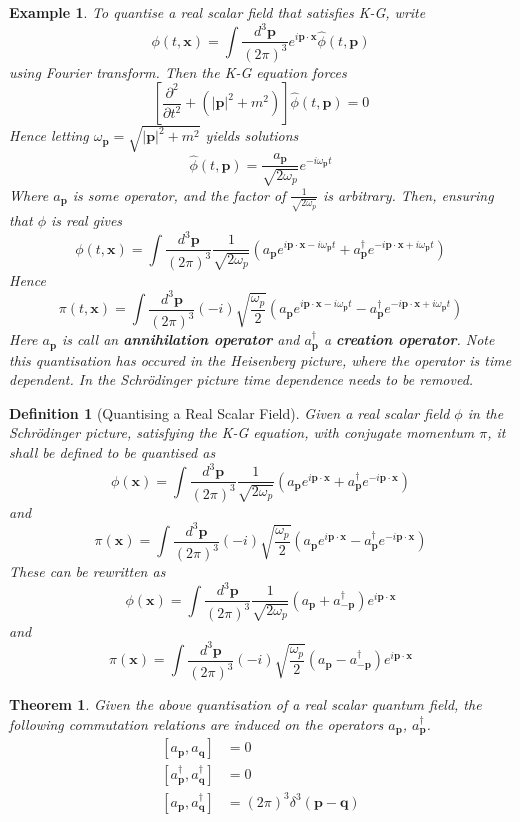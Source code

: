 \documentclass{article}
\newtheorem{theorem}{Theorem}[subsection]
\newtheorem{definition}{Definition}[subsection]
\newtheorem{example}{Example}[subsection]
\newcommand{\tmeas}{\frac{d^3\bm{p}}{(2\pi)^3}}
\newcommand{\bam}[1]{\textbf{#1}}
\newcommand{\comm}[2][]{\left[ #1, #2 \right]} %
\newcommand{\pds}[2][]{\frac{\partial^2 #1}{\partial #2^2}} %
\begin{document}
\begin{example}
To quantise a real scalar field that satisfies K-G, write 
\[
\phi(t,\bm{x})=\int\tmeas e^{i\bm{p}\cdot\bm{x}} \hat{\phi}(t,\bm{p})
\]
using Fourier transform. Then the K-G equation forces 
\[
\left[\pds{t}+(|\bm{p}|^2+m^2)\right]\hat{\phi}(t,\bm{p})=0
\]
Hence letting $\omega_{\bm{p}}=\sqrt{|\bm{p}|^2+m^2}$ yields solutions 
\[
\hat{\phi}(t,\bm{p})=\frac{a_{\bm{p}}}{\sqrt{2\omega_p}} e^{-i\omega_{\bm{p}} t}
\]
Where $a_{\bm{p}}$ is some operator, and the factor of 
$\frac{1}{\sqrt{2\omega_p}}$ is arbitrary. Then, ensuring that $\phi$ is real gives 
\[
\phi(t,\bm{x})=\int\tmeas  \frac{1}{\sqrt{2\omega_p}} \left( a_{\bm{p}} e^{i\bm{p}\cdot\bm{x}-i\omega_{\bm{p}} t} + a_{\bm{p}}^\dagger e^{-i\bm{p}\cdot\bm{x}+i\omega_{\bm{p}} t} \right)
\]
Hence 
\[
\pi(t,\bm{x})=\int\tmeas  (-i)\sqrt{\frac{\omega_p}{2}} \left( a_{\bm{p}} e^{i\bm{p}\cdot\bm{x}-i\omega_{\bm{p}} t} - a_{\bm{p}}^\dagger e^{-i\bm{p}\cdot\bm{x}+i\omega_{\bm{p}} t} \right)
\]
Here $a_{\bm{p}}$ is call an \bam{annihilation operator} and $a_{\bm{p}}^\dagger$ a \bam{creation operator}. Note this quantisation has occured in the Heisenberg picture, where the operator is time dependent. In the Schr\"odinger picture time dependence needs to be removed.
\end{example}

\begin{definition}[Quantising a Real Scalar Field]
Given a real scalar field $\phi$ in the Schr\"odinger picture, satisfying the K-G equation, with conjugate momentum $\pi$, it shall be defined to be quantised as
\[
\phi(\bm{x})=\int\tmeas  \frac{1}{\sqrt{2\omega_p}} \left( a_{\bm{p}} e^{i\bm{p}\cdot\bm{x}} + a_{\bm{p}}^\dagger e^{-i\bm{p}\cdot\bm{x}} \right)
\]
and
\[
\pi(\bm{x})=\int\tmeas  (-i)\sqrt{\frac{\omega_p}{2}} \left( a_{\bm{p}} e^{i\bm{p}\cdot\bm{x}} - a_{\bm{p}}^\dagger e^{-i\bm{p}\cdot\bm{x}} \right)
\]
These can be rewritten as 
\[
\phi(\bm{x})=\int\tmeas  \frac{1}{\sqrt{2\omega_p}} \left( a_{\bm{p}}  + a_{-\bm{p}}^\dagger  \right)e^{i\bm{p}\cdot\bm{x}}
\]
and
\[
\pi(\bm{x})=\int\tmeas  (-i)\sqrt{\frac{\omega_p}{2}} \left( a_{\bm{p}}  - a_{-\bm{p}}^\dagger  \right)e^{i\bm{p}\cdot\bm{x}}
\]
\end{definition}

\begin{theorem}
Given the above quantisation of a real scalar quantum field, the following commutation relations are induced on the operators $a_{\bm{p}}$, $a_{\bm{p}}^\dagger$. 
\begin{align*}
    \comm[a_{\bm{p}}]{a_{\bm{q}}} &= 0 \\
    \comm[a_{\bm{p}}^\dagger]{a_{\bm{q}}^\dagger} &= 0 \\
    \comm[a_{\bm{p}}]{a_{\bm{q}}^\dagger} &= (2\pi)^3 \delta^3(\bm{p}-\bm{q})
\end{align*}
\end{theorem}
\end{document}
